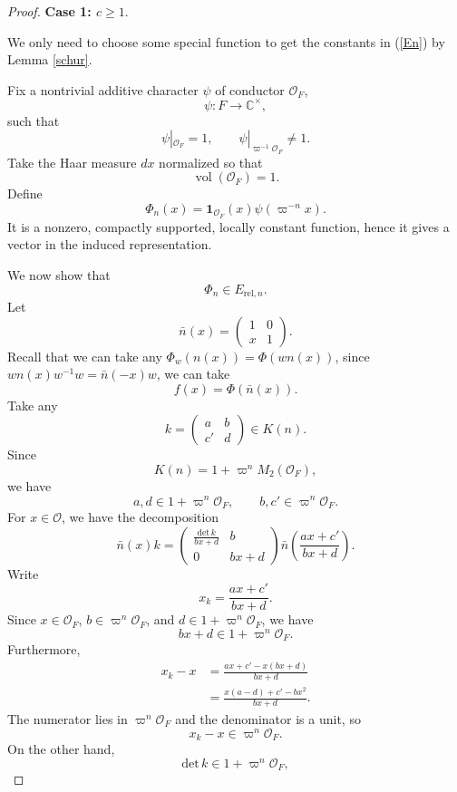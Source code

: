\documentclass[11pt]{amsart}
\renewcommand{\rm}{\mathrm}
\theoremstyle{definition}
\numberwithin{equation}{section}
\begin{document}
	\begin{proof}
		\textbf{Case 1: \(c\ge1.\)}
		
		
		We only need to choose some special function to get the constants in (\ref{En}) by Lemma \ref{schur}.
		
		
		Fix a nontrivial additive character \(\psi\) of conductor \(\mathcal{O}_F\), 
		\[
		\psi : F \longrightarrow \mathbb{C}^\times,
		\]
		such that
		\[
		\psi|_{\mathcal{O}_F} = 1, \qquad \psi|_{\varpi^{-1}\mathcal{O}_F} \neq 1.
		\]
		Take the Haar measure \(dx\) normalized so that
		\[
		\operatorname{vol}(\mathcal{O}_F) = 1.
		\]
		Define
		\[
		\Phi_n(x) = \mathbf{1}_{\mathcal{O}_F}(x)\psi(\varpi^{-n}x).
		\]
		It is a nonzero, compactly supported, locally constant function, hence it gives a vector in the induced representation.
		
		We now show that
		\[
		\Phi_n \in E_{\rm{rel},n}.
		\]
		Let
		\[
		\bar{n}(x) = \begin{pmatrix} 1 & 0 \\ x & 1 \end{pmatrix}.
		\]
		Recall that we can take any \(\Phi_w(n(x))=\Phi(wn(x))\), since \(wn(x)w^{-1}w=\bar{n}(-x)w\), we can take
		\[
		f(x) = \Phi(\bar{n}(x)).
		\]
		Take any
		\[
		k = \begin{pmatrix} a & b \\ c' & d \end{pmatrix} \in K(n).
		\]
		Since
		\[
		K(n) = 1 + \varpi^n M_2(\mathcal{O}_F),
		\]
		we have
		\[
		a, d \in 1 + \varpi^n \mathcal{O}_F, \qquad b, c' \in \varpi^n \mathcal{O}_F.
		\]
		For \(x \in \mathcal{O}\), we have the decomposition
		\[
		\bar{n}(x)k = \begin{pmatrix} \frac{\rm{det}\,k}{bx+d} & b \\ 0 & bx+d \end{pmatrix} \bar{n}\left(\frac{ax+c'}{bx+d}\right).
		\]
		Write
		\[
		x_k = \frac{ax+c'}{bx+d}.
		\]
		Since \(x \in \mathcal{O}_F\), \(b \in \varpi^n \mathcal{O}_F\), and \(d \in 1 + \varpi^n \mathcal{O}_F\), we have
		\[
		bx+d \in 1 + \varpi^n \mathcal{O}_F.
		\]
		Furthermore,
		\begin{align*}
			x_k - x &= \frac{ax+c' - x(bx+d)}{bx+d} \\
			&= \frac{x(a-d) + c' - bx^2}{bx+d}.
		\end{align*}
		The numerator lies in \(\varpi^n \mathcal{O}_F\) and the denominator is a unit, so
		\[
		x_k - x \in \varpi^n \mathcal{O}_F.
		\]
		On the other hand,
		\[
		\rm{det}\, k \in 1 + \varpi^n \mathcal{O}_F,
\]
\end{proof}
\end{document}
